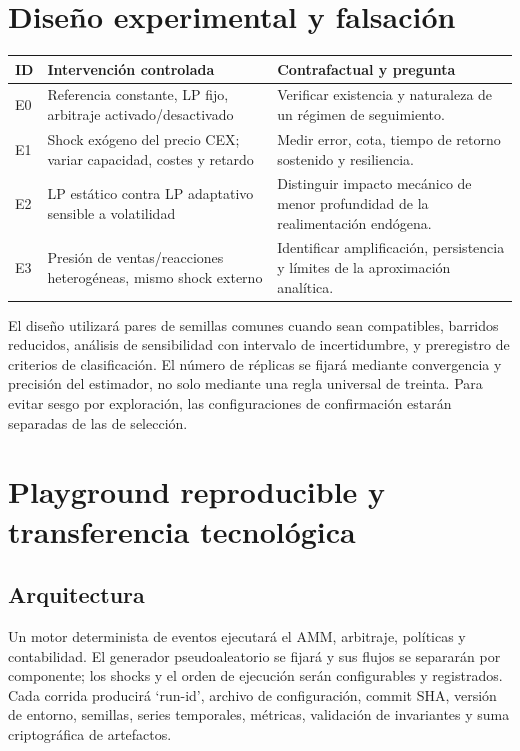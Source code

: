 \documentclass[11pt,a4paper]{article}
\begin{document}
\section{Diseño experimental y falsación}
\begin{table}[ht]
\centering\small
\begin{tabular}{p{.08\linewidth}p{.33\linewidth}p{.46\linewidth}}
\toprule ID & Intervención controlada & Contrafactual y pregunta \\\midrule
E0 & Referencia constante, LP fijo, arbitraje activado/desactivado & Verificar existencia y naturaleza de un régimen de seguimiento.\\
E1 & Shock exógeno del precio CEX; variar capacidad, costes y retardo & Medir error, cota, tiempo de retorno sostenido y resiliencia.\\
E2 & LP estático contra LP adaptativo sensible a volatilidad & Distinguir impacto mecánico de menor profundidad de la realimentación endógena.\\
E3 & Presión de ventas/reacciones heterogéneas, mismo shock externo & Identificar amplificación, persistencia y límites de la aproximación analítica.\\
\bottomrule
\end{tabular}
\end{table}
El diseño utilizará pares de semillas comunes cuando sean compatibles, barridos reducidos, análisis de sensibilidad con intervalo de incertidumbre, y preregistro de criterios de clasificación. El número de réplicas se fijará mediante convergencia y precisión del estimador, no solo mediante una regla universal de treinta. Para evitar sesgo por exploración, las configuraciones de confirmación estarán separadas de las de selección.
\section{Playground reproducible y transferencia tecnológica}
\subsection{Arquitectura}
Un motor determinista de eventos ejecutará el AMM, arbitraje, políticas y contabilidad. El generador pseudoaleatorio se fijará y sus flujos se separarán por componente; los shocks y el orden de ejecución serán configurables y registrados. Cada corrida producirá `run-id', archivo de configuración, commit SHA, versión de entorno, semillas, series temporales, métricas, validación de invariantes y suma criptográfica de artefactos.
\end{document}
